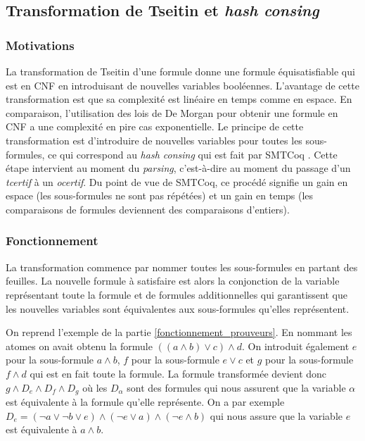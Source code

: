 \documentclass[11pt]{article}
\begin{document}
\subsection{Transformation de Tseitin et \textit{hash consing}} \label{tseitin}

\subsubsection{Motivations}

La transformation de Tseitin d'une formule donne une formule équisatisfiable qui est en CNF en introduisant de nouvelles variables booléennes. L'avan\-tage de cette transformation est que sa complexité est linéaire en temps comme en espace. En comparaison, l'utilisation des lois de De Morgan pour obtenir une formule en CNF a une complexité en pire cas exponentielle. Le principe de cette transformation est d'introduire de nouvelles variables pour toutes les sous-formules, ce qui correspond au \textit{hash consing} qui est fait par SMTCoq \cite{smtcoq_code}. Cette étape intervient au moment du \textit{parsing}, c'est-à-dire au moment du passage d'un \textit{tcertif} à un \textit{ocertif}. Du point de vue de SMTCoq, ce procédé signifie un gain en espace (les sous-formules ne sont pas répétées) et un gain en temps (les comparaisons de formules deviennent des comparaisons d'entiers).


\subsubsection{Fonctionnement}

La transformation commence par nommer toutes les sous-formules en partant des feuilles. La nouvelle formule à satisfaire est alors la conjonction de la variable représentant toute la formule et de formules additionnelles qui garantissent que les nouvelles variables sont équivalentes aux sous-formules qu'elles représentent. \medbreak

On reprend l'exemple de la partie \ref{fonctionnement_prouveurs}. En nommant les atomes on avait obtenu la formule $((a \wedge b) \vee c) \wedge d$. On introduit également $e$ pour la sous-formule $a \wedge b$, $f$ pour la sous-formule $e \vee c$ et $g$ pour la sous-formule $f \wedge d$ qui est en fait toute la formule. La formule transformée devient donc $g \wedge D_e \wedge D_f \wedge D_g$ où les $D_\alpha$ sont des formules qui nous assurent que la variable $\alpha$ est équivalente à la formule qu'elle représente. On a par exemple $D_e = (\neg a \vee \neg b \vee e) \wedge (\neg e \vee a) \wedge (\neg e \wedge b)$ qui nous assure que la variable $e$ est équivalente à $a \wedge b$. \medbreak
\end{document}
